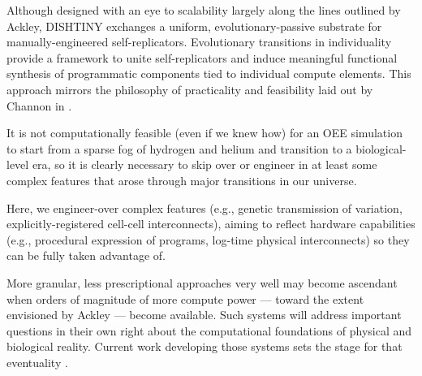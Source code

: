 Although designed with an eye to scalability largely along the lines outlined by Ackley, DISHTINY exchanges a uniform, evolutionary-passive substrate for manually-engineered self-replicators.
Evolutionary transitions in individuality provide a framework to unite self-replicators and induce meaningful functional synthesis of programmatic components tied to individual compute elements.
This approach mirrors the philosophy of practicality and feasibility laid out by Channon in \citep{channon2019maximum}.

\begin{displayquote}
It is not computationally feasible (even if we knew how) for an OEE simulation to start from a sparse fog of hydrogen and helium and transition to a biological-level era, so it is clearly necessary to skip over or engineer in at least some complex features that arose through major transitions in our universe.
\end{displayquote}

Here, we engineer-over complex features (e.g., genetic transmission of variation, explicitly-registered cell-cell interconnects), aiming to reflect hardware capabilities (e.g., procedural expression of programs, log-time physical interconnects) so they can be fully taken advantage of.

More granular, less prescriptional approaches very well may become ascendant when orders of magnitude of more compute power --- toward the extent envisioned by Ackley --- become available.
Such systems will address important questions in their own right about the computational foundations of physical and biological reality.
Current work developing those systems sets the stage for that eventuality \citep{ackley2018alife}.
